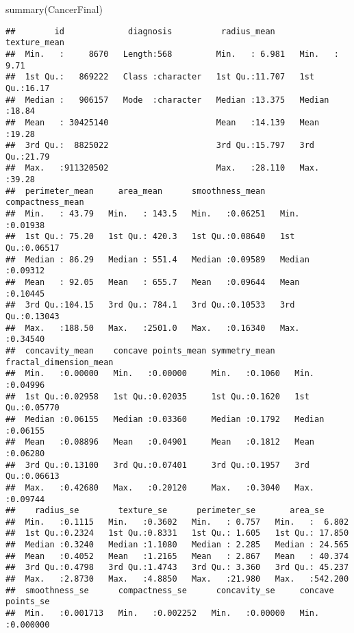 \documentclass[
]{article}
\newenvironment{Shaded}{\begin{snugshade}}{\end{snugshade}}
\newcommand{\FunctionTok}[1]{\textcolor[rgb]{0.00,0.00,0.00}{#1}}
\newcommand{\NormalTok}[1]{#1}
\begin{document}
\begin{Shaded}
\begin{Highlighting}[]
\FunctionTok{summary}\NormalTok{(CancerFinal)}
\end{Highlighting}
\end{Shaded}

\begin{verbatim}
##        id             diagnosis          radius_mean      texture_mean  
##  Min.   :     8670   Length:568         Min.   : 6.981   Min.   : 9.71  
##  1st Qu.:   869222   Class :character   1st Qu.:11.707   1st Qu.:16.17  
##  Median :   906157   Mode  :character   Median :13.375   Median :18.84  
##  Mean   : 30425140                      Mean   :14.139   Mean   :19.28  
##  3rd Qu.:  8825022                      3rd Qu.:15.797   3rd Qu.:21.79  
##  Max.   :911320502                      Max.   :28.110   Max.   :39.28  
##  perimeter_mean     area_mean      smoothness_mean   compactness_mean 
##  Min.   : 43.79   Min.   : 143.5   Min.   :0.06251   Min.   :0.01938  
##  1st Qu.: 75.20   1st Qu.: 420.3   1st Qu.:0.08640   1st Qu.:0.06517  
##  Median : 86.29   Median : 551.4   Median :0.09589   Median :0.09312  
##  Mean   : 92.05   Mean   : 655.7   Mean   :0.09644   Mean   :0.10445  
##  3rd Qu.:104.15   3rd Qu.: 784.1   3rd Qu.:0.10533   3rd Qu.:0.13043  
##  Max.   :188.50   Max.   :2501.0   Max.   :0.16340   Max.   :0.34540  
##  concavity_mean    concave points_mean symmetry_mean    fractal_dimension_mean
##  Min.   :0.00000   Min.   :0.00000     Min.   :0.1060   Min.   :0.04996       
##  1st Qu.:0.02958   1st Qu.:0.02035     1st Qu.:0.1620   1st Qu.:0.05770       
##  Median :0.06155   Median :0.03360     Median :0.1792   Median :0.06155       
##  Mean   :0.08896   Mean   :0.04901     Mean   :0.1812   Mean   :0.06280       
##  3rd Qu.:0.13100   3rd Qu.:0.07401     3rd Qu.:0.1957   3rd Qu.:0.06613       
##  Max.   :0.42680   Max.   :0.20120     Max.   :0.3040   Max.   :0.09744       
##    radius_se        texture_se      perimeter_se       area_se       
##  Min.   :0.1115   Min.   :0.3602   Min.   : 0.757   Min.   :  6.802  
##  1st Qu.:0.2324   1st Qu.:0.8331   1st Qu.: 1.605   1st Qu.: 17.850  
##  Median :0.3240   Median :1.1080   Median : 2.285   Median : 24.565  
##  Mean   :0.4052   Mean   :1.2165   Mean   : 2.867   Mean   : 40.374  
##  3rd Qu.:0.4798   3rd Qu.:1.4743   3rd Qu.: 3.360   3rd Qu.: 45.237  
##  Max.   :2.8730   Max.   :4.8850   Max.   :21.980   Max.   :542.200  
##  smoothness_se      compactness_se      concavity_se     concave points_se 
##  Min.   :0.001713   Min.   :0.002252   Min.   :0.00000   Min.   :0.000000  

\end{verbatim}
\end{document}
